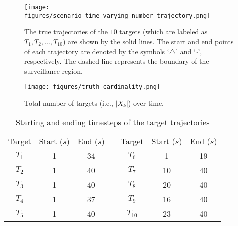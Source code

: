\begin{figure}[h]
\centering    
\texttt{[image: figures/scenario\_time\_varying\_number\_trajectory.png]}    
    \caption{The true trajectories of the $10$ targets (which are labeled as $T_1, T_2, \dots, T_{10}$) are shown by the solid lines. The start and end points of each trajectory are denoted by the symbols `$\triangle$' and `$\square$', respectively. The dashed line represents the boundary of the surveillance region.} 
    \label{fig:trajectories}
\end{figure}
%
\begin{figure}[h]
\centering
\texttt{[image: figures/truth\_cardinality.png]}    
    \caption{Total number of targets (i.e., $|X_k|$) over time.} 
    \label{truth_cardinality}
\end{figure}

\begin{table}[h]
\centering
\caption{Starting and ending timesteps of the target trajectories}
\label{table_start_end_trajectories}
    \begin{tabular}{|c|c|c|c|c|c|c|} 
        \cline{1-3} \cline{5-7}
        Target & Start ($s$) & End ($s$) && Target  & Start ($s$) & End ($s$) \\ 
        \cline{1-3} \cline{5-7}
        $T_1$ & 1 & 34 && $T_6$ & 1 & 19 \\ 
        \cline{1-3} \cline{5-7}
        $T_2$ & 1 & 40 && $T_7$ & 10 & 40 \\ 
        \cline{1-3} \cline{5-7}
        $T_3$ & 1 & 40 && $T_8$ & 20 & 40 \\ 
        \cline{1-3} \cline{5-7}
        $T_4$ & 1 & 37 && $T_9$ & 16 & 40 \\ 
        \cline{1-3} \cline{5-7}
        $T_5$ & 1 & 40 && $T_{10}$ & 23 & 40 \\ 
        \cline{1-3} \cline{5-7}
    \end{tabular}
\end{table}


